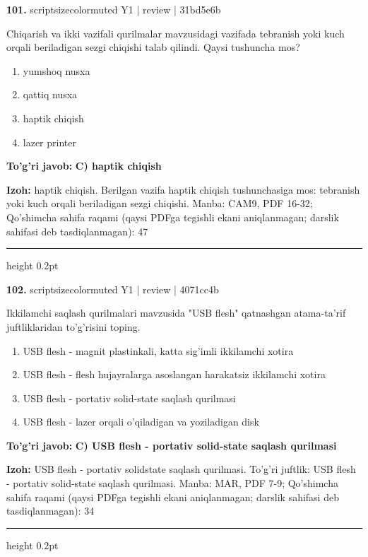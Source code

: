 \documentclass[10pt,a4paper]{article}
\begin{document}
{\bfseries\sffamily\color{ink} 101.} {scriptsizecolor{muted} Y1 | review | 31bd5e6b}
\par
Chiqarish va ikki vazifali qurilmalar mavzusidagi vazifada tebranish yoki kuch orqali beriladigan sezgi chiqishi talab qilindi. Qaysi tushuncha mos?
\begin{enumerate}[label=\Alph*),leftmargin=9mm]
\item yumshoq nusxa
\item qattiq nusxa
\item haptik chiqish
\item lazer printer
\end{enumerate}
\begin{tcolorbox}[enhanced,breakable,colback=teal!4,colframe=teal!60!black,boxrule=0.45pt,arc=1.2mm,left=2.7mm,right=2.7mm,top=1.8mm,bottom=1.8mm,before skip=2mm,after skip=2mm]
{\bfseries\sffamily\color{teal}To'g'ri javob:} \textbf{C) haptik chiqish}
\par\smallskip
{\bfseries Izoh:} haptik chiqish. Berilgan vazifa haptik chiqish tushunchasiga mos: tebranish yoki kuch orqali beriladigan sezgi chiqishi. Manba: CAM9, PDF 16-32; Qo'shimcha sahifa raqami (qaysi PDFga tegishli ekani aniqlanmagan; darslik sahifasi deb tasdiqlanmagan): 47
\end{tcolorbox}
\vspace{2mm}\hrule height 0.2pt\vspace{3mm}

{\bfseries\sffamily\color{ink} 102.} {scriptsizecolor{muted} Y1 | review | 4071cc4b}
\par
Ikkilamchi saqlash qurilmalari mavzusida "USB flesh" qatnashgan atama-ta'rif juftliklaridan to'g'risini toping.
\begin{enumerate}[label=\Alph*),leftmargin=9mm]
\item USB flesh - magnit plastinkali, katta sig'imli ikkilamchi xotira
\item USB flesh - flesh hujayralarga asoslangan harakatsiz ikkilamchi xotira
\item USB flesh - portativ solid-state saqlash qurilmasi
\item USB flesh - lazer orqali o'qiladigan va yoziladigan disk
\end{enumerate}
\begin{tcolorbox}[enhanced,breakable,colback=teal!4,colframe=teal!60!black,boxrule=0.45pt,arc=1.2mm,left=2.7mm,right=2.7mm,top=1.8mm,bottom=1.8mm,before skip=2mm,after skip=2mm]
{\bfseries\sffamily\color{teal}To'g'ri javob:} \textbf{C) USB flesh - portativ solid-state saqlash qurilmasi}
\par\smallskip
{\bfseries Izoh:} USB flesh - portativ solidstate saqlash qurilmasi. To'g'ri juftlik: USB flesh - portativ solid-state saqlash qurilmasi. Manba: MAR, PDF 7-9; Qo'shimcha sahifa raqami (qaysi PDFga tegishli ekani aniqlanmagan; darslik sahifasi deb tasdiqlanmagan): 34
\end{tcolorbox}
\vspace{2mm}\hrule height 0.2pt\vspace{3mm}
\end{document}
